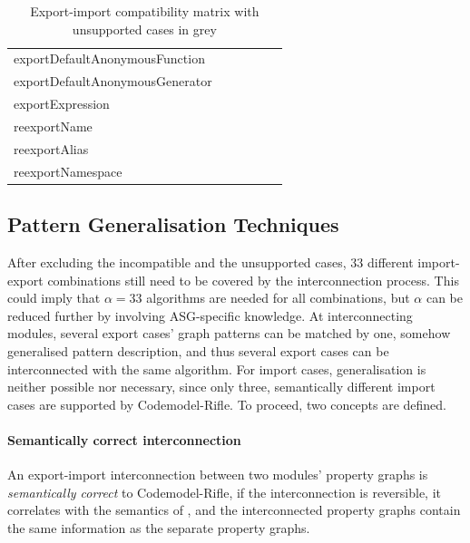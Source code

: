 \begin{table}[!htb]
\begin{tabular}{l|cccgg}
		{exportDefaultAnonymousFunction}		& \nop & \nop & \yep & \nop & \yep \\
		\rowcolor{grey}
		{exportDefaultAnonymousGenerator}		& \nop & \nop & \yep & \nop & \yep \\
		{exportExpression}									& \nop & \nop & \nop & \nop & \yep \\
		{reexportName}											& \yep & \yep & \nop & \yep & \yep \\
		\rowcolor{grey}
		{reexportAlias}											& \yep & \yep & \nop & \yep & \yep \\
		{reexportNamespace}									& \yep & \yep & \yep & \yep & \yep \\
		\hline
	\end{tabular}

	\caption{Export-import compatibility matrix with unsupported cases in grey}
	\label{table:export-import-compatibility}
\end{table}


\subsection{Pattern Generalisation Techniques}

After excluding the incompatible and the unsupported cases, $33$ different import-export combinations still need to be covered by the interconnection process. This could imply that $\alpha = 33$ algorithms are needed for all combinations, but $\alpha$ can be reduced further by involving ASG-specific knowledge. At interconnecting modules, several export cases' graph patterns can be matched by one, somehow generalised pattern description, and thus several export cases can be interconnected with the same algorithm. For import cases, generalisation is neither possible nor necessary, since only three, semantically different import cases are supported by Codemodel-Rifle. To proceed, two concepts are defined.

\paragraph{Semantically correct interconnection}

An export-import interconnection between two modules' property graphs is \emph{semantically correct} to Codemodel-Rifle, if the interconnection is reversible, it correlates with the semantics of \es, and the interconnected property graphs contain the same information as the separate property graphs.

